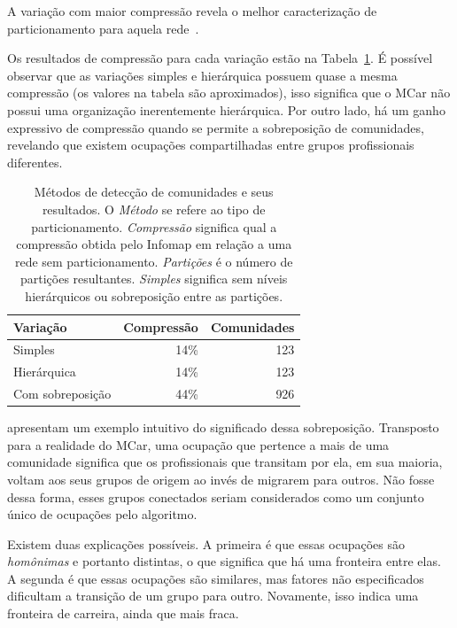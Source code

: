 \documentclass[
  article,
  11pt,
  a4paper,
  english,
  brazil,
  sumario=tradicional]{abntex2}
\begin{document}
A variação com maior compressão revela o melhor caracterização de particionamento para aquela rede~\cite{Viamontes_Esquivel2011-it,Rosvall2011-yi}.

Os resultados de compressão para cada variação estão na Tabela~\ref{tab:metodos}. É possível observar que as variações simples e hierárquica possuem quase a mesma compressão (os valores na tabela são aproximados), isso significa que o MCar não possui uma organização inerentemente hierárquica. Por outro lado, há um ganho expressivo de compressão quando se permite a sobreposição de comunidades, revelando que existem ocupações compartilhadas entre grupos profissionais diferentes.

\begin{table}
  \centering
  \begin{tabular}{@{} l r r @{}}
    \toprule
    Variação         & Compressão & Comunidades  \\
    \midrule
    Simples          & 14\%       & 123     \\
    Hierárquica      & 14\%       & 123     \\
    Com sobreposição & 44\%       & 926     \\
    \bottomrule
  \end{tabular}
  \caption{Métodos de detecção de comunidades e seus resultados. O \textit{Método} se refere ao tipo de particionamento. \textit{Compressão} significa qual a compressão obtida pelo Infomap em relação a uma rede sem particionamento. \textit{Partições} é o número de partições resultantes. \textit{Simples} significa sem níveis hierárquicos ou sobreposição entre as partições.}
  \label{tab:metodos}
\end{table}

 apresentam um exemplo intuitivo do significado dessa sobreposição. Transposto para a realidade do MCar, uma ocupação que pertence a mais de uma comunidade significa que os profissionais que transitam por ela, em sua maioria, voltam aos seus grupos de origem ao invés de migrarem para outros. Não fosse dessa forma, esses grupos conectados seriam considerados como um conjunto único de ocupações pelo algoritmo.

Existem duas explicações possíveis. A primeira é que essas ocupações são \textit{homônimas} e portanto distintas, o que significa que há uma fronteira entre elas. A segunda é que essas ocupações são similares, mas fatores não especificados dificultam a transição de um grupo para outro. Novamente, isso indica uma fronteira de carreira, ainda que mais fraca.
\end{document}
